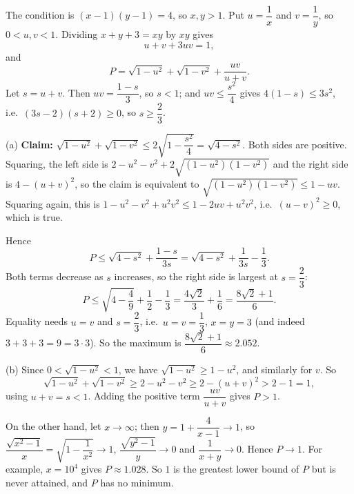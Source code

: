 The condition is $(x-1)(y-1)=4$, so $x,y>1$. Put $u=\dfrac{1}{x}$ and $v=\dfrac{1}{y}$, so $0<u,v<1$. Dividing $x+y+3=xy$ by $xy$ gives
\[
u+v+3uv=1,
\]
and
\[
P=\sqrt{1-u^2}+\sqrt{1-v^2}+\dfrac{uv}{u+v}.
\]
Let $s=u+v$. Then $uv=\dfrac{1-s}{3}$, so $s<1$; and $uv\le\dfrac{s^2}{4}$ gives $4(1-s)\le3s^2$, i.e.\ $(3s-2)(s+2)\ge0$, so $s\ge\dfrac{2}{3}$.

(a) \textbf{Claim:} $\sqrt{1-u^2}+\sqrt{1-v^2}\le2\sqrt{1-\dfrac{s^2}{4}}=\sqrt{4-s^2}$. Both sides are positive. Squaring, the left side is $2-u^2-v^2+2\sqrt{(1-u^2)(1-v^2)}$ and the right side is $4-(u+v)^2$, so the claim is equivalent to $\sqrt{(1-u^2)(1-v^2)}\le1-uv$. Squaring again, this is $1-u^2-v^2+u^2v^2\le1-2uv+u^2v^2$, i.e.\ $(u-v)^2\ge0$, which is true.

Hence
\[
P\le\sqrt{4-s^2}+\dfrac{1-s}{3s}=\sqrt{4-s^2}+\dfrac{1}{3s}-\dfrac{1}{3} .
\]
Both terms decrease as $s$ increases, so the right side is largest at $s=\dfrac{2}{3}$:
\[
P\le\sqrt{4-\dfrac{4}{9}}+\dfrac{1}{2}-\dfrac{1}{3}=\dfrac{4\sqrt2}{3}+\dfrac{1}{6}=\dfrac{8\sqrt2+1}{6}.
\]
Equality needs $u=v$ and $s=\dfrac{2}{3}$, i.e.\ $u=v=\dfrac{1}{3}$, $x=y=3$ (and indeed $3+3+3=9=3\cdot3$). So the maximum is $\boxed{\dfrac{8\sqrt2+1}{6}}\approx2.052$.

(b) Since $0<\sqrt{1-u^2}<1$, we have $\sqrt{1-u^2}\ge1-u^2$, and similarly for $v$. So
\[
\sqrt{1-u^2}+\sqrt{1-v^2}\ge2-u^2-v^2\ge2-(u+v)^2>2-1=1,
\]
using $u+v=s<1$. Adding the positive term $\dfrac{uv}{u+v}$ gives $P>1$.

On the other hand, let $x\to\infty$; then $y=1+\dfrac{4}{x-1}\to1$, so $\dfrac{\sqrt{x^2-1}}{x}=\sqrt{1-\dfrac{1}{x^2}}\to1$, $\dfrac{\sqrt{y^2-1}}{y}\to0$ and $\dfrac{1}{x+y}\to0$. Hence $P\to1$. For example, $x=10^4$ gives $P\approx1.028$. So $1$ is the greatest lower bound of $P$ but is never attained, and $P$ has no minimum.
